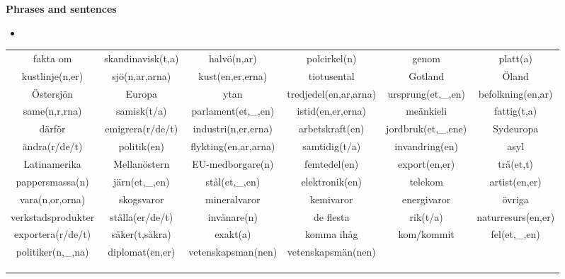 
\begin{flushleft}
    \textbf{Phrases and sentences}
    \begin{itemize}
        \item 
    \end{itemize}
\end{flushleft}

\begin{center}
    \begin{adjustwidth}{-2.7cm}{}
        \begin{tabular}{|c c c c c c|}
            \hline
            fakta om & skandinavisk(t,a) & halvö(n,ar) & polcirkel(n) & genom & platt(a) \\
            kustlinje(n,er) & sjö(n,ar,arna) & kust(en,er,erna) & tiotusental & Gotland & Öland \\
            Östersjön & Europa & ytan & tredjedel(en,ar,arna) & ursprung(et,\_,en) & befolkning(en,ar) \\
            same(n,r,rna) & samisk(t/a) & parlament(et,\_,en) & istid(en,er,erna) & meänkieli & fattig(t,a) \\
            därför & emigrera(r/de/t) & industri(n,er,erna) & arbetskraft(en) & jordbruk(et,\_,ene) & Sydeuropa \\
            ändra(r/de/t) & politik(en) & flykting(en,ar,arna) & samtidig(t/a) & invandring(en) & asyl \\
            Latinamerika & Mellanöstern & EU-medborgare(n) & femtedel(en) & export(en,er) & trä(et,t) \\
            pappersmassa(n) & järn(et,\_,en) & stål(et,\_,en) & elektronik(en) & telekom & artist(en,er) \\
            vara(n,or,orna) & skogsvaror & mineralvaror & kemivaror & energivaror & övriga \\
            verkstadsprodukter & ställa(er/de/t) & invånare(n) & de flesta & rik(t/a) & naturresurs(en,er) \\
            exportera(r/de/t) & säker(t,säkra) & exakt(a) & komma ihåg & kom/kommit & fel(et,\_,en) \\
            politiker(n,\_,na) & diplomat(en,er) & vetenskapsman(nen) & vetenskapsmän(nen) &  &  \\
             &  &  &  &  &  \\
             &  &  &  &  &  \\
             &  &  &  &  &  \\

\end{tabular}
\end{adjustwidth}
\end{center}
